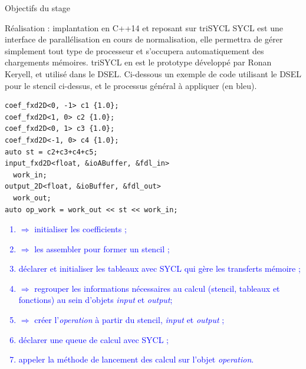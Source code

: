 \documentclass[a4paper,10pt]{article}
\begin{document}
\begin{center}
\begin{bclogo}[couleur=black!10,couleurBord=black!50,arrondi=0.1,logo=\hspace{17pt},barre=none]{Objectifs du stage}
\end{bclogo}

\vspace{0.15cm}

\begin{bclogo}[couleur=black!10,couleurBord=black!50,arrondi=0.1,logo=\hspace{17pt},barre=none]{Réalisation : implantation en C++14 et reposant sur triSYCL}
\textsf{SYCL} est une interface de parallélisation en cours de normalisation, elle permettra de gérer simplement tout type de processeur et s'occupera automatiquement des chargements mémoires. \textsf{triSYCL} en est le prototype développé par Ronan Keryell, et utilisé dans le DSEL. Ci-dessous un exemple de code utilisant le DSEL pour le stencil ci-dessus, et le processus général à appliquer (en bleu).

\begin{minipage}[c]{0.55\textwidth}
\begin{verbatim}
coef_fxd2D<0, -1> c1 {1.0};
coef_fxd2D<1, 0> c2 {1.0};
coef_fxd2D<0, 1> c3 {1.0};
coef_fxd2D<-1, 0> c4 {1.0};
auto st = c2+c3+c4+c5;
input_fxd2D<float, &ioABuffer, &fdl_in> 
  work_in;
output_2D<float, &ioBuffer, &fdl_out> 
  work_out;
auto op_work = work_out << st << work_in;
\end{verbatim}
\end{minipage}%
\begin{minipage}[c]{0.45\textwidth}
\textcolor{blue}{
\begin{enumerate}[itemsep=-1mm]
\item $\Rightarrow$ initialiser les coefficients ;
\item $\Rightarrow$ les assembler pour former un stencil ;
\item déclarer et initialiser les tableaux avec \textsf{SYCL} qui gère les transferts mémoire ;
\item $\Rightarrow$ regrouper les informations nécessaires au calcul (stencil, tableaux et fonctions) au sein d'objets \emph{input} et \emph{output};
\item $\Rightarrow$ créer l'\emph{operation} à partir du stencil, \emph{input} et \emph{output} ;
\item déclarer une queue de calcul avec \textsf{SYCL} ;
\item appeler la méthode de lancement des calcul sur l'objet \emph{operation}.
\end{enumerate}
}
\end{minipage}


\end{bclogo}
\end{center}
\end{document}
